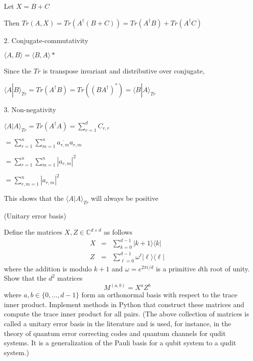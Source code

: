 \documentclass[12pt]{article}
\renewcommand{\>}{\rangle}
\newcommand{\<}{\langle}
\newcommand{\C}{\mathbb{C}}
\begin{document}
	\quad Let $X = B + C$
	
	\quad Then $Tr(A,X) = Tr(A^\dagger (B+C)) = Tr(A^\dagger B) + Tr(A^\dagger C)$

2. Conjugate-commutativity

	\quad $\<A,B\> = \<B,A\>*$

	\quad Since the $Tr$ is transpose invariant and distributive over conjugate,
	
	\quad $\<A|B\>_{Tr} = Tr(A^\dagger B) = Tr((BA^\dagger)^*) = \<B|A\>_{Tr} $
	
3. Non-negativity
	
	\quad $ \<A|A\>_{Tr} = Tr(A^\dagger A) = \sum_{r=1}^d C_{r,r} $ 

	\quad $ = \sum_{r=1}^n \sum_{m=1}^n \overline{a_{r,m}} a_{r,m} $
	
	\quad $ = \sum_{r=1}^n \sum_{m=1}^n |a_{r,m}|^2$
	
	\quad $ = \sum_{r,m=1}^n |a_{r,m}|^2$

	\quad This shows that the $\<A|A\>_{Tr} $ will always be positive
\newpage


 (Unitary error basis)

\noindent
Define the matrices $X,Z\in\C^{d\times d}$ as follows
\begin{eqnarray}
X & = & \sum_{k=0}^{d-1} |k+1\>\<k| \\
Z & = & \sum_{\ell=0}^{d-1} \omega^\ell |\ell\>\<\ell|
\end{eqnarray}
where the addition is modulo $k+1$ and $\omega=e^{2\pi i/d}$ is a primitive $d$th root of unity. Show that the $d^2$ matrices
\[
M^{(a,b)} = X^a Z^b
\]
where $a,b\in\{0,\ldots, d-1\}$ form an orthonormal basis with respect to the trace inner product. Implement methods in Python that construct these matrices and compute the trace inner product for all pairs. (The above collection of matrices is called a unitary error basis in the literature and is used, for instance, in the theory of quantum error correcting codes and quantum channels for qudit systems. It is a generalization of the Pauli basis for a qubit system to a qudit system.)
\end{document}
